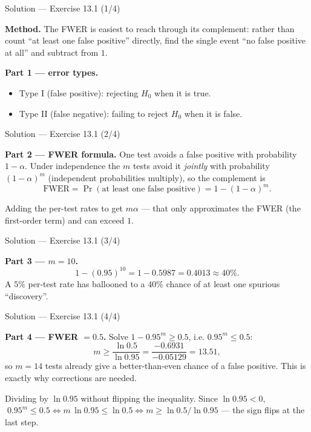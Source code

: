 \documentclass[aspectratio=169,11pt]{beamer}
\begin{document}
\begin{frame}{Solution --- Exercise 13.1 (1/4)}
\begin{solutionbox}
  \textbf{Method.} The FWER is easiest to reach through its complement: rather than
  count ``at least one false positive'' directly, find the single event ``no false
  positive at all'' and subtract from $1$.

  \medskip
  \textbf{Part 1 --- error types.}
  \begin{itemize}
    \item Type I (false positive): rejecting $H_0$ when it is true.
    \item Type II (false negative): failing to reject $H_0$ when it is
          false.
  \end{itemize}
\end{solutionbox}
\end{frame}

\begin{frame}{Solution --- Exercise 13.1 (2/4)}
\begin{solutionbox}
  \medskip
  \textbf{Part 2 --- FWER formula.} One test avoids a false positive with
  probability $1 - \alpha$. Under independence the $m$ tests avoid it
  \emph{jointly} with probability $(1-\alpha)^m$ (independent probabilities
  multiply), so the complement is
  \[
    \mathrm{FWER}=\Pr(\text{at least one false positive})
    = 1 - (1 - \alpha)^m .
  \]
\end{solutionbox}
\begin{mistake}
  Adding the per-test rates to get $m\alpha$ --- that only approximates the FWER
  (the first-order term) and can exceed $1$.
\end{mistake}
\end{frame}

\begin{frame}{Solution --- Exercise 13.1 (3/4)}
\begin{solutionbox}
  \textbf{Part 3 --- $m = 10$.}
  \[
    1 - (0.95)^{10} = 1 - 0.5987 = 0.4013 \approx 40\% .
  \]
  A $5\%$ per-test rate has ballooned to a $40\%$ chance of at least
  one spurious ``discovery''.
\end{solutionbox}
\end{frame}

\begin{frame}{Solution --- Exercise 13.1 (4/4)}
\begin{solutionbox}
  \medskip
  \textbf{Part 4 --- FWER $= 0.5$.} Solve $1 - 0.95^m \ge 0.5$, i.e.
  $0.95^m \le 0.5$:
  \[
    m \ge \frac{\ln 0.5}{\ln 0.95}
        = \frac{-0.6931}{-0.05129} = 13.51 ,
  \]
  so $m = 14$ tests already give a better-than-even chance of a false
  positive. This is exactly why corrections are needed.

\end{solutionbox}
\begin{mistake}
  Dividing by $\ln 0.95$ without flipping the inequality. Since $\ln 0.95<0$,
  $\;0.95^m\le 0.5 \iff m\,\ln 0.95\le \ln 0.5 \iff m\ge \ln 0.5/\ln 0.95$ ---
  the sign flips at the last step.
\end{mistake}
\end{frame}
\end{document}
